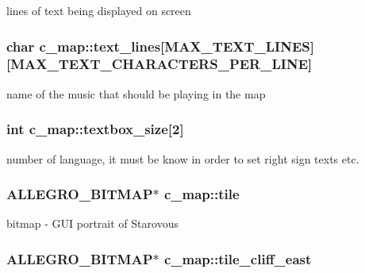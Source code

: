 lines of text being displayed on screen \hypertarget{classc__map_a97c58015fb3e1e4764d6a522880c5ccf}{
\subsubsection[{text\-\_\-lines}]{\setlength{\rightskip}{0pt plus 5cm}char c\-\_\-map\-::text\-\_\-lines\mbox{[}M\-A\-X\-\_\-\-T\-E\-X\-T\-\_\-\-L\-I\-N\-E\-S\mbox{]}\mbox{[}M\-A\-X\-\_\-\-T\-E\-X\-T\-\_\-\-C\-H\-A\-R\-A\-C\-T\-E\-R\-S\-\_\-\-P\-E\-R\-\_\-\-L\-I\-N\-E\mbox{]}\hspace{0.3cm}{\ttfamily [protected]}}}\label{classc__map_a97c58015fb3e1e4764d6a522880c5ccf}
name of the music that should be playing in the map \hypertarget{classc__map_a2c290e7b1d47f8c846fc77aa4464c8e7}{
\subsubsection[{textbox\-\_\-size}]{\setlength{\rightskip}{0pt plus 5cm}int c\-\_\-map\-::textbox\-\_\-size\mbox{[}2\mbox{]}\hspace{0.3cm}{\ttfamily [protected]}}}\label{classc__map_a2c290e7b1d47f8c846fc77aa4464c8e7}
number of language, it must be know in order to set right sign texts etc. \hypertarget{classc__map_a928e809cafb17cee55193944f6aafe24}{
\subsubsection[{tile}]{\setlength{\rightskip}{0pt plus 5cm}A\-L\-L\-E\-G\-R\-O\-\_\-\-B\-I\-T\-M\-A\-P$\ast$ c\-\_\-map\-::tile\hspace{0.3cm}{\ttfamily [protected]}}}\label{classc__map_a928e809cafb17cee55193944f6aafe24}
bitmap -\/ G\-U\-I portrait of Starovous \hypertarget{classc__map_a105d6f1355ca490246a8a5bf56bbe844}{
\subsubsection[{tile\-\_\-cliff\-\_\-east}]{\setlength{\rightskip}{0pt plus 5cm}A\-L\-L\-E\-G\-R\-O\-\_\-\-B\-I\-T\-M\-A\-P$\ast$ c\-\_\-map\-::tile\-\_\-cliff\-\_\-east\hspace{0.3cm}{\ttfamily [protected]}}}\label{classc__map_a105d6f1355ca490246a8a5bf56bbe844}
